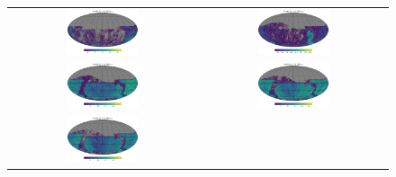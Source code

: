 \documentclass[preprintm,linenumbers]{aastex631}
\begin{document}
		
  		\begin{figure}
			\centering
			\begin{tabular}{c c}
				\includegraphics[width=0.4\textwidth]{results/skymaps/skymap_first_year_one_snap_v4_0_10yrs_db_noDD_noTwi_tscale-7_nside-256_doAllTemplateMetrics_reduceCount_u_noDD_noTwi.pdf} &
				\includegraphics[width=0.4\textwidth]{results/skymaps/skymap_first_year_one_snap_v4_0_10yrs_db_noDD_noTwi_tscale-7_nside-256_doAllTemplateMetrics_reduceCount_g_noDD_noTwi.pdf} \\
				\includegraphics[width=0.4\textwidth]{results/skymaps/skymap_first_year_one_snap_v4_0_10yrs_db_noDD_noTwi_tscale-7_nside-256_doAllTemplateMetrics_reduceCount_r_noDD_noTwi.pdf} &
				\includegraphics[width=0.4\textwidth]{results/skymaps/skymap_first_year_one_snap_v4_0_10yrs_db_noDD_noTwi_tscale-7_nside-256_doAllTemplateMetrics_reduceCount_i_noDD_noTwi.pdf} \\
				\includegraphics[width=0.4\textwidth]{results/skymaps/skymap_first_year_one_snap_v4_0_10yrs_db_noDD_noTwi_tscale-7_nside-256_doAllTemplateMetrics_reduceCount_z_noDD_noTwi.pdf} &

\end{tabular}
\end{figure}
\end{document}
